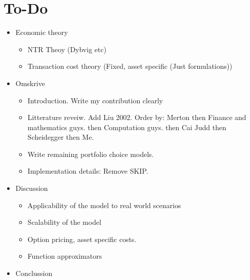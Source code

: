 \documentclass[11pt]{article}
\begin{document}
\section{To-Do}\label{sec:To-Do}
\begin{itemize}
  \item Economic theory
      \begin{itemize}
        \item NTR Theoy (Dybvig etc)
        \item Transaction cost theory (Fixed, asset specific (Just formulations))
      \end{itemize}
  \item Omskrive
\begin{itemize}
  \item Introduction. Write my contribution clearly
  \item Litterature reveiw. Add Liu 2002. Order by: Merton then Finance and mathematics guys. then Computation guys. then Cai Judd then Scheidegger then Me.
  \item Write remaining portfolio choice models.
  \item Implementation details: Remove SKIP.
\end{itemize}
\item Discussion
\begin{itemize}
  \item Applicability of the model to real world scenarios
  \item Scalability of the model
  \item Option pricing, asset specific costs.
  \item Function approximators 
\end{itemize}
\item Conclussion 
\end{itemize}





% 



\newpage

\begingroup 
  \hypersetup{linkcolor=black}

  \hypersetup{
    colorlinks=true,
    citecolor=black,
    linkcolor=black,
    filecolor=black, 
    urlcolor=black}
  \printbibliography
\endgroup

\newpage


\end{document}
